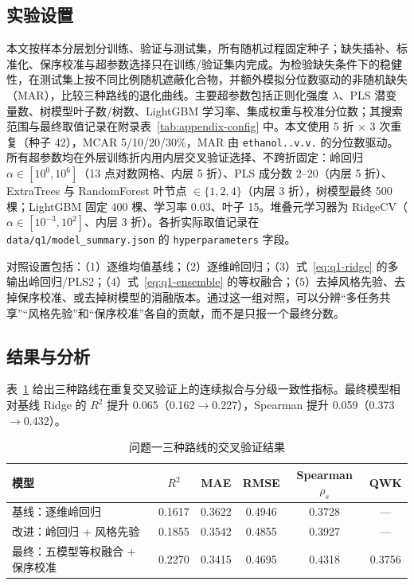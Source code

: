 \subsection{实验设置}

本文按样本分层划分训练、验证与测试集，所有随机过程固定种子；缺失插补、标准化、保序校准与超参数选择只在训练/验证集内完成。为检验缺失条件下的稳健性，在测试集上按不同比例随机遮蔽化合物，并额外模拟分位数驱动的非随机缺失（MAR），比较三种路线的退化曲线。主要超参数包括正则化强度 $\lambda$、PLS 潜变量数、树模型叶子数/树数、LightGBM 学习率、集成权重与校准分位数；其搜索范围与最终取值记录在附录表~\ref{tab:appendix-config} 中。本文使用 5 折 $\times$ 3 次重复（种子 42），MCAR 5/10/20/30\%，MAR 由 \texttt{ethanol..v.v.} 的分位数驱动。所有超参数均在外层训练折内用内层交叉验证选择、不跨折固定：岭回归 $\alpha\in[10^{0},10^{6}]$（13 点对数网格、内层 5 折）、PLS 成分数 $2$--$20$（内层 5 折）、ExtraTrees 与 RandomForest 叶节点 $\in\{1,2,4\}$（内层 3 折），树模型最终 500 棵；LightGBM 固定 400 棵、学习率 0.03、叶子 15。堆叠元学习器为 RidgeCV（$\alpha\in[10^{-3},10^{2}]$、内层 3 折）。各折实际取值记录在 \texttt{data/q1/model\_summary.json} 的 \texttt{hyperparameters} 字段。

对照设置包括：（1）逐维均值基线；（2）逐维岭回归；（3）式~\eqref{eq:q1-ridge} 的多输出岭回归/PLS2；（4）式~\eqref{eq:q1-ensemble} 的等权融合；（5）去掉风格先验、去掉保序校准、或去掉树模型的消融版本。通过这一组对照，可以分辨“多任务共享”“风格先验”和“保序校准”各自的贡献，而不是只报一个最终分数。

\subsection{结果与分析}

表~\ref{tab:q1-results} 给出三种路线在重复交叉验证上的连续拟合与分级一致性指标。最终模型相对基线 Ridge 的 $R^2$ 提升 0.065（0.162$\to$0.227），Spearman 提升 0.059（0.373$\to$0.432）。

\begin{table}[htbp]
  \centering
  \caption{问题一三种路线的交叉验证结果}
  \label{tab:q1-results}
  \small
  \begin{tabular}{@{}l c c c c c@{}}
    \toprule
    模型 & $R^2$ & MAE & RMSE & Spearman $\rho_s$ & QWK \\
    \midrule
    基线：逐维岭回归 & 0.1617 & 0.3622 & 0.4946 & 0.3728 & — \\
    改进：岭回归 + 风格先验 & 0.1855 & 0.3542 & 0.4855 & 0.3927 & — \\
    最终：五模型等权融合 + 保序校准 & 0.2270 & 0.3415 & 0.4695 & 0.4318 & 0.3756 \\
    \bottomrule
  \end{tabular}
\end{table}

